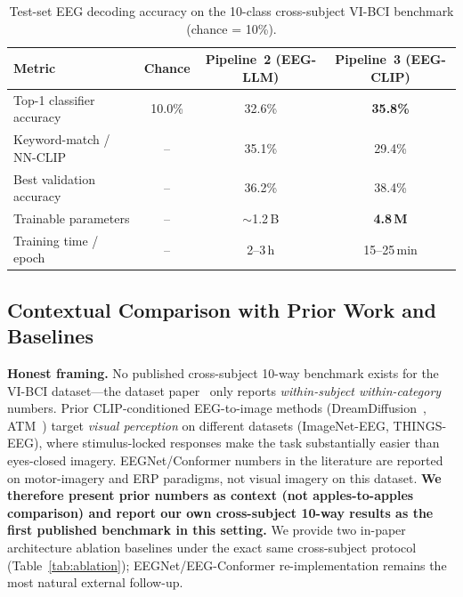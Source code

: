\documentclass{article}
\begin{document}
\begin{table}[h]
  \centering
  \caption{Test-set EEG decoding accuracy on the 10-class cross-subject VI-BCI benchmark (chance = 10\%).}
  \label{tab:accuracy}
  \small
  \begin{tabular}{lccc}
    \toprule
    \textbf{Metric} & \textbf{Chance} & \textbf{Pipeline~2 (EEG-LLM)} & \textbf{Pipeline~3 (EEG-CLIP)} \\
    \midrule
    Top-1 classifier accuracy      & 10.0\% & 32.6\%              & \textbf{35.8\%} \\
    Keyword-match / NN-CLIP        & --     & 35.1\%              & 29.4\% \\
    Best validation accuracy       & --     & 36.2\%              & 38.4\% \\
    Trainable parameters           & --     & $\sim$1.2\,B        & \textbf{4.8\,M} \\
    Training time / epoch          & --     & 2--3\,h             & 15--25\,min \\
    \bottomrule
  \end{tabular}
\end{table}

\subsection{Contextual Comparison with Prior Work and Baselines}
\label{sec:context}

\textbf{Honest framing.} No published cross-subject 10-way benchmark exists for the VI-BCI dataset---the dataset paper~\citep{figshare_paper} only reports \emph{within-subject within-category} numbers. Prior CLIP-conditioned EEG-to-image methods (DreamDiffusion~\citep{bai2023dreamdiffusion}, ATM~\citep{li2024atm}) target \emph{visual perception} on different datasets (ImageNet-EEG, THINGS-EEG), where stimulus-locked responses make the task substantially easier than eyes-closed imagery. EEGNet/Conformer numbers in the literature are reported on motor-imagery and ERP paradigms, not visual imagery on this dataset. \textbf{We therefore present prior numbers as context (not apples-to-apples comparison) and report our own cross-subject 10-way results as the first published benchmark in this setting.} We provide two in-paper architecture ablation baselines under the exact same cross-subject protocol (Table~\ref{tab:ablation}); EEGNet/EEG-Conformer re-implementation remains the most natural external follow-up.
\end{document}
